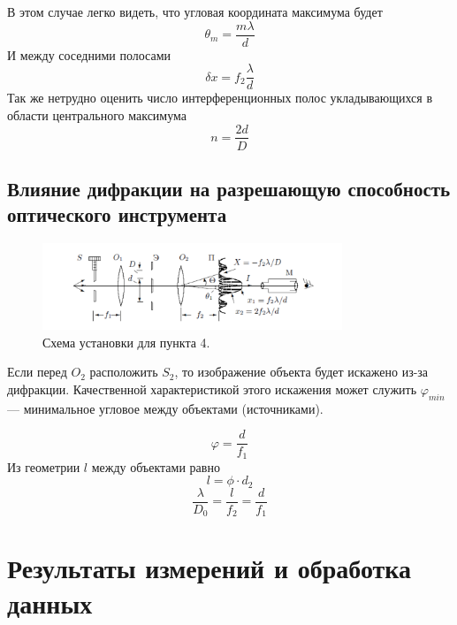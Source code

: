 \documentclass[a4paper, 12pt]{article}%
\begin{document}
В этом случае легко видеть, что угловая координата максимума будет 
\begin{equation}
\theta_m = \frac{m \lambda}{d}
\end{equation}
И между соседними полосами 
\begin{equation}
\delta x = f_2 \frac{\lambda}{d}
\end{equation}
Так же нетрудно оценить число интерференционных полос укладывающихся в области центрального максимума 
\begin{equation}
n = \frac{2d}{D}
\end{equation}

\newpage

\subsection*{Влияние дифракции на разрешающую способность оптического инструмента}

\begin{figure}[h]
\begin{center}
\includegraphics[width = 0.8\textwidth]{pics/5.png}
\caption{Схема установки для пункта 4.}
\end{center}
\end{figure}

Если перед $O_2$ расположить $S_2$, то изображение объекта будет искажено из-за дифракции. Качественной характеристикой этого искажения может служить $\varphi_{min}$ --- минимальное угловое между объектами (источниками). 

\begin{equation}
\varphi = \frac{d}{f_1}
\end{equation}
Из геометрии $l$ между объектами равно 
\begin{equation}
l = \phi \cdot d_2
\end{equation}
\begin{equation}
\dfrac{\lambda}{D_0} = \dfrac{l}{f_2} = \dfrac{d}{f_1}
\end{equation}

\newpage
\section{Результаты измерений и обработка данных}
\end{document}

